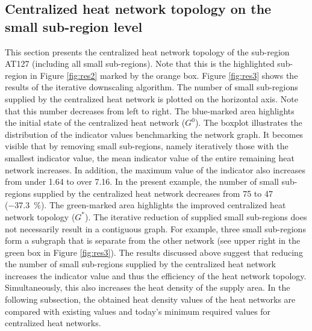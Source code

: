 \subsection{Centralized heat network topology on the small sub-region level}\label{res:4}
This section presents the centralized heat network topology of the sub-region AT127 (including all small sub-regions). Note that this is the highlighted sub-region in Figure \ref{fig:res2} marked by the orange box. Figure \ref{fig:res3} shows the results of the iterative downscaling algorithm. The number of small sub-regions supplied by the centralized heat network is plotted on the horizontal axis. Note that this number decreases from left to right. The blue-marked area highlights the initial state of the centralized heat network ($G^{0}$). The boxplot illustrates the distribution of the indicator values benchmarking the network graph. It becomes visible that by removing small sub-regions, namely iteratively those with the smallest indicator value, the mean indicator value of the entire remaining heat network increases. In addition, the maximum value of the indicator also increases from under 1.64 to over 7.16. In the present example, the number of small sub-regions supplied by the centralized heat network decreases from \SI{75}{} to \SI{47}{} (\SI{-37.3}{\%}). The green-marked area highlights the improved centralized heat network topology ($G^{*}$). The iterative reduction of supplied small sub-regions does not necessarily result in a contiguous graph. For example, three small sub-regions form a subgraph that is separate from the other network (see upper right in the green box in Figure \ref{fig:res3}). The results discussed above suggest that reducing the number of small sub-regions supplied by the centralized heat network increases the indicator value and thus the efficiency of the heat network topology. Simultaneously, this also increases the heat density of the supply area. In the following subsection, the obtained heat density values of the heat networks are compared with existing values and today's minimum required values for centralized heat networks.

